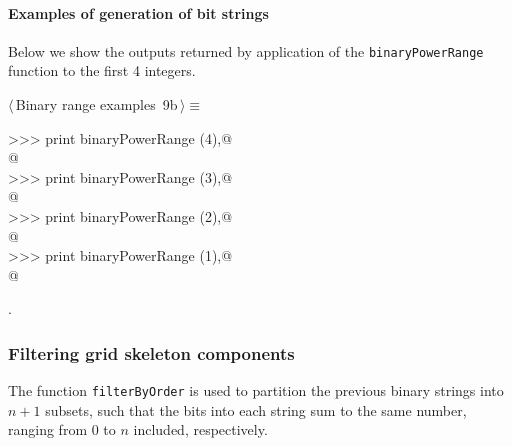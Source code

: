 \documentclass[11pt,oneside]{article}	%
\begin{document}
\paragraph{Examples of generation of bit strings}
Below we show the outputs returned by application of the \texttt{binaryPowerRange} function to the first 4 integers.
\begin{flushleft} \small \label{scrap12}
\protect{}$\langle\,$Binary range examples\nobreak\ {\footnotesize 9b}$\,\rangle\equiv$
\vspace{-1ex}
\begin{list}{}{} \item
\mbox{}\verb@>>> print binaryPowerRange (4),@\\
\mbox{}@\\
\mbox{}\verb@>>> print binaryPowerRange (3),@\\
\mbox{}\verb@['000', '001', '010', '011', '100', '101', '110', '111']@\\
\mbox{}\verb@>>> print binaryPowerRange (2),@\\
\mbox{}\verb@['00', '01', '10', '11']@\\
\mbox{}\verb@>>> print binaryPowerRange (1),@\\
\mbox{}\verb@['0', '1']@\\
\mbox{}\verb@@{\NWsep}
\end{list}
\vspace{-1ex}
\footnotesize\addtolength{\baselineskip}{-1ex}
\begin{list}{}{\setlength{\itemsep}{-\parsep}\setlength{\itemindent}{-\leftmargin}}
\item {\NWtxtMacroNoRef}.
\end{list}
\end{flushleft}

\subsubsection{Filtering grid skeleton components}
\label{sec:filterByOrder}

The function \texttt{filterByOrder} is used to partition the previous binary strings into $n+1$ subsets, such that the bits into each string sum to the same number, ranging from 0 to $n$ included, respectively.
\end{document}
